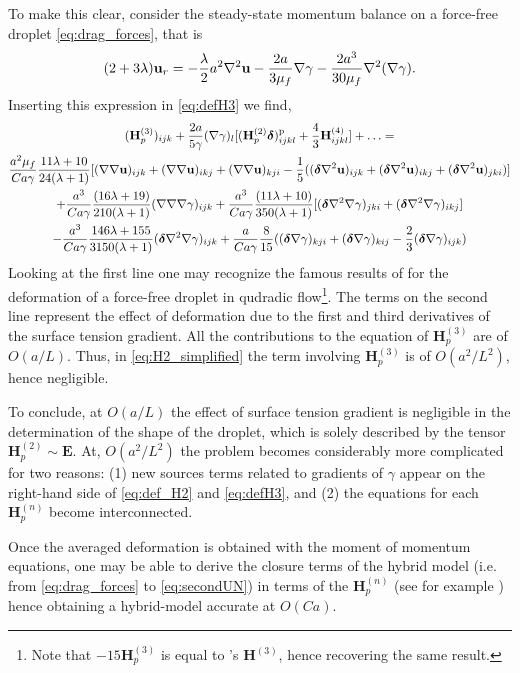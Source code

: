 To make this clear, consider the steady-state momentum balance on a force-free droplet \eqref{eq:drag_forces}, that is 
\begin{equation}
    (2+3\lambda)\textbf{u}_r
    = 
    -\frac{\lambda}{2} a^2\mathbf{\nabla}^2 \textbf{u}
    -\frac{2a}{3 \mu_f } \mathbf{\nabla} \gamma
    -\frac{2 a^3}{30\mu_f }\mathbf{\nabla}^2(\mathbf{\nabla}\gamma).
\end{equation} 
Inserting this expression in \ref{eq:defH3} we find, 
\begin{multline}
    (\textbf{H}_p^{(3)})_{ijk}
    +
    \frac{2a}{5\gamma}(\mathbf{\nabla} \gamma)_l[  
    (\textbf{H}_p^{(2)}\bm\delta)^\text{p}_{ijkl}
    +
    \frac{4}{3} \textbf{H}^{(4)}_{ijkl}]
    +\ldots
    =\\
    \frac{a^2 \mu_f }{Ca\gamma}\frac{11\lambda+10}{24(\lambda+1)} [
        (\mathbf{\nabla} \mathbf{\nabla} \textbf{u})_{ijk}
        +(\mathbf{\nabla} \mathbf{\nabla} \textbf{u})_{ikj}
        +(\mathbf{\nabla} \mathbf{\nabla} \textbf{u})_{kji}
        - \frac{1}{5}(
            (\bm\delta \mathbf{\nabla}^2 \textbf{u})_{ijk}
            + (\bm\delta \mathbf{\nabla}^2 \textbf{u})_{ikj}
            + (\bm\delta \mathbf{\nabla}^2 \textbf{u})_{jki}
        )
        ]
    \\
    +\frac{a^3 }{Ca\gamma}\frac{(16\lambda +19)}{210(\lambda+1)}(\mathbf{\nabla}\mathbf{\nabla}\mathbf{\nabla}\gamma)_{ijk}
    +\frac{a^3 }{Ca\gamma}\frac{(11\lambda +10)}{350(\lambda+1)}
    [(\bm\delta \mathbf{\nabla}^2\mathbf{\nabla} \gamma)_{jki}+ (\bm\delta \mathbf{\nabla}^2\mathbf{\nabla} \gamma)_{ikj}]\\
    - \frac{a^3 }{Ca\gamma} \frac{146\lambda +155}{3150(\lambda+1)}(\bm\delta \mathbf{\nabla}^2\mathbf{\nabla} \gamma)_{ijk}
    +\frac{a}{Ca \gamma} \frac{8}{15}(
        (\bm\delta \mathbf{\nabla}\gamma)_{kji}
        + (\bm\delta \mathbf{\nabla}\gamma)_{kij}
        -\frac{2}{3}(\bm\delta \mathbf{\nabla}\gamma)_{ijk}
    )
\end{multline} 
Looking at the first line one may recognize the famous results of \citet{nadim1991motion} for the deformation of a force-free droplet in qudradic flow\footnote{Note that $- 15 \textbf{H}_p^{(3)}$ is equal to \citet{nadim1991motion}'s $\textbf{H}^{(3)}$, hence recovering the same result.  }.  
The terms on the second line represent the effect of deformation due to the first and third derivatives of the surface tension gradient. 
All the contributions to the equation of $\textbf{H}_p^{(3)}$ are of $O(a/L)$. 
Thus, in \ref{eq:H2_simplified} the term involving $\textbf{H}_p^{(3)}$ is of $O(a^2/L^2)$, hence negligible.

To conclude, at $O(a/L)$ the effect of surface tension gradient is negligible in the determination of the shape of the droplet, which is solely described by the tensor $\textbf{H}_p^{(2)}\sim \textbf{E}$. 
At, $O(a^2/L^2)$ the problem becomes considerably more complicated for two reasons: (1) new sources terms related to gradients of $\gamma$ appear on the right-hand side of \ref{eq:def_H2} and \ref{eq:defH3}, and (2) the equations for each $\textbf{H}_p^{(n)}$ become interconnected.  

Once the averaged deformation is obtained with the moment of momentum equations, one may be able to derive the closure terms of the hybrid model (i.e. from \ref{eq:drag_forces} to \ref{eq:secondUN}) in terms of the $\textbf{H}_p^{(n)}$ (see for example \citet{haber1971dynamics}) hence obtaining a hybrid-model accurate at $O(Ca)$. 


